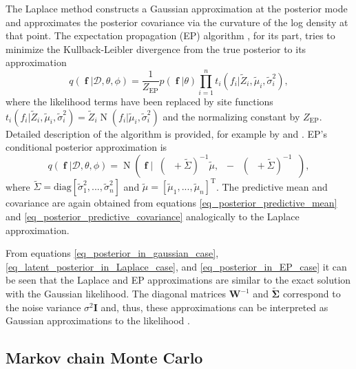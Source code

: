 \documentclass[twoside,11pt]{article}
\DeclareMathOperator{\Kff}{\mathbf{K}_{f,f}}
\DeclareMathOperator{\f}{\mathbf{f}}
\DeclareMathOperator{\N}{N}
\newcommand{\mb}{\mathbf}
\begin{document}
The Laplace method constructs a Gaussian approximation at the
posterior mode and approximates the posterior covariance via the
curvature of the log density at that point. The expectation
propagation (EP) algorithm \citep{Minka:2001}, for its part, tries to
minimize the Kullback-Leibler divergence from the true posterior to
its approximation
%
\begin{equation}\label{eq_EP_post}
 q(\f|\mathcal{D},
\theta,\phi) = \frac{1}{Z_{\text{EP}}}p(\f|\theta)\prod_{i=1}^n
t_i(f_i|\tilde{Z}_i, \tilde{\mu}_i,\tilde{\sigma}_i^2),
\end{equation}
%
where the likelihood terms have been replaced by site functions
$t_i(f_i|\tilde{Z}_i, \tilde{\mu}_i,\tilde{\sigma}_i^2) = \tilde{Z}_i
\N(f_i|\tilde{\mu}_i,\tilde{\sigma}_i^2)$ and the normalizing constant
by $Z_{\text{EP}}$. Detailed description of the algorithm is
provided, for example by \citet{Rasmussen+Williams:2006} and
\citet{Jylanki+Vanhatalo+Vehtari:2011}. EP's conditional posterior
approximation is
%
\begin{equation}\label{eq_posterior_in_EP_case}
q(\f|\mathcal{D},\theta,\phi) = \N(\f|\Kff(\Kff +
  \tilde{\Sigma})^{-1} \tilde{\mu}, \Kff -  \Kff(\Kff +
  \tilde{\Sigma})^{-1}\Kff),
\end{equation}
%
where $\tilde{\Sigma} =
\text{diag}[\tilde{\sigma}_1^{2},...,\tilde{\sigma}_n^{2}]$ and
$\tilde{\mu} = [\tilde{\mu}_1,...,\tilde{\mu}_n]^{\text{T}}$. The
predictive mean and covariance are again obtained from equations
\eqref{eq_posterior_predictive_mean} and
\eqref{eq_posterior_predictive_covariance} analogically to the Laplace
approximation.

From equations \eqref{eq_posterior_in_gaussian_case},
\eqref{eq_latent_posterior_in_Laplace_case}, and
\eqref{eq_posterior_in_EP_case} it can be seen that the Laplace and EP
approximations are similar to the exact solution with the Gaussian
likelihood. The diagonal matrices $\mb{W}^{-1}$ and
$\mb{\tilde{\Sigma}}$ correspond to the noise variance
$\sigma^2\mb{I}$ and, thus, these approximations can be interpreted as
Gaussian approximations to the likelihood
\citep{Nickisch+Rasmussen:2008}.


\subsection{Markov chain Monte
  Carlo}\label{sec_MCMC_for_conditional_of_latents}
\end{document}
